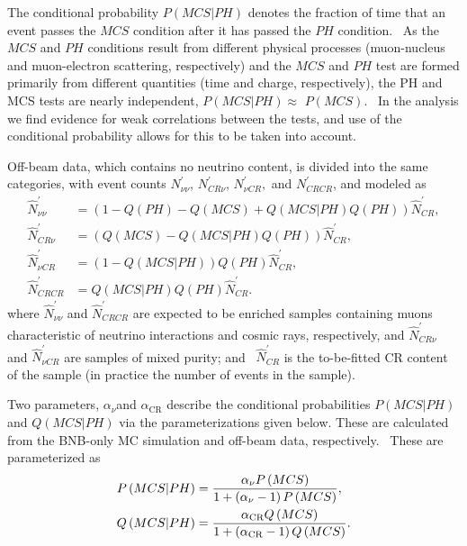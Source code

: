 \documentclass{article}
\begin{document}
The conditional probability $P\left(  MCS|PH\right)  $ denotes the fraction of
time that an event passes the $MCS$ condition after it has passed the $PH$
condition. \ As the $MCS$ and $PH$ conditions result from different physical
processes (muon-nucleus and muon-electron scattering, respectively) and the
$MCS$ and $PH$ test are formed primarily from different quantities (time and
charge, respectively), the PH and MCS tests are nearly independent, $P\left(
MCS|PH\right)  \approx$ $P\left(  MCS\right)  $. \ In the analysis we find
evidence for weak correlations between the tests, and use of the conditional
probability allows for this to be taken into account.

Off-beam data, which contains no neutrino content, is divided into the same
categories, with event counts $N_{\nu\nu}^{\prime}$, $N_{CR\nu}^{\prime}$,
$N_{\nu CR}^{\prime},$ and $N_{CRCR}^{\prime}$, and modeled as%
\begin{align}
\hat{N}_{\nu\nu}^{\prime} &  =\left(  1-Q\left(  PH\right)  -Q\left(
MCS\right)  +Q\left(  MCS|PH\right)  Q\left(  PH\right)  \right)  \hat{N}%
_{CR}^{\prime},\label{model 5}\\
\hat{N}_{CR\nu}^{\prime} &  =\left(  Q\left(  MCS\right)  -Q\left(
MCS|PH\right)  Q\left(  PH\right)  \right)  \hat{N}_{CR}^{\prime
},\label{model 6}\\
\hat{N}_{\nu CR}^{\prime} &  =\left(  1-Q\left(  MCS|PH\right)  \right)
Q\left(  PH\right)  \hat{N}_{CR}^{\prime},\label{model 7}\\
\hat{N}_{CRCR}^{\prime} &  =Q\left(  MCS|PH\right)  Q\left(  PH\right)
\hat{N}_{CR}^{\prime}.\label{model 8}%
\end{align}
where $\hat{N}_{\nu\nu}^{\prime}$ and $\hat{N}_{CRCR}^{\prime}$ are expected
to be enriched samples containing muons characteristic of neutrino
interactions and cosmic rays, respectively, and $\hat{N}_{CR\nu}^{\prime}$ and
$\hat{N}_{\nu CR}^{\prime}$ are samples of mixed purity; and \ $\hat{N}%
_{CR}^{\prime}$ is the to-be-fitted CR content of the sample (in practice the
number of events in the sample).

Two parameters, $\alpha _{\nu }$and  $\alpha _{\text{CR}}$ describe the
conditional probabilities $P\left( MCS|PH\right) $ and $Q\left(
MCS|PH\right) $ via the parameterizations given below$.$ These are calculated
from the BNB-only MC simulation and off-beam data, respectively. \
These are parameterized as%
\begin{align}
P\left( MCS|PH\right) & =\frac{\alpha _{\nu }P\left( MCS\right) }{1+\left(
\alpha _{\nu }-1\right) P\left( MCS\right) }, \\
Q\left( MCS|PH\right) & =\frac{\alpha _{\text{CR}}Q\left( MCS\right) }{%
1+\left( \alpha _{\text{CR}}-1\right) Q\left( MCS\right) }.
\end{align} 
\end{document}
